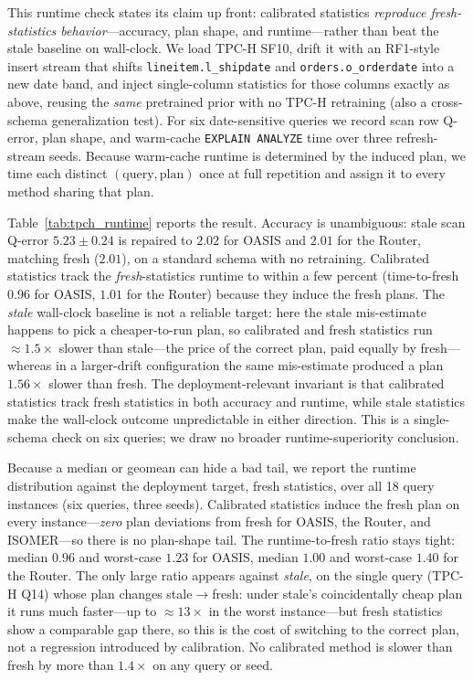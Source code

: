 \documentclass[preprint,12pt]{elsarticle}
\newcommand{\oasisUseMaxWidthResize}[1]{%
  \renewcommand{\resizebox}[3]{\adjustbox{max width=#1}{##3}}%
}
\begin{document}
This runtime check states its claim up front: calibrated statistics \emph{reproduce
fresh-statistics behavior}---accuracy, plan shape, and runtime---rather than beat the stale
baseline on wall-clock. We load TPC-H
SF10, drift it with an RF1-style insert stream that shifts \texttt{lineitem.l\_shipdate}
and \texttt{orders.o\_orderdate} into a new date band, and inject single-column
statistics for those columns exactly as above, reusing the \emph{same} pretrained prior
with no TPC-H retraining (also a cross-schema generalization test). For six
date-sensitive queries we record scan row Q-error, plan shape, and warm-cache
\texttt{EXPLAIN ANALYZE} time over three refresh-stream seeds. Because warm-cache
runtime is determined by the induced plan, we time each distinct $(\text{query},
\text{plan})$ once at full repetition and assign it to every method sharing that plan.

\begingroup
\oasisUseMaxWidthResize{.92\columnwidth}

\endgroup

Table~\ref{tab:tpch_runtime} reports the result. Accuracy is unambiguous: stale scan
Q-error $5.23\pm0.24$ is repaired to $2.02$ for OASIS and $2.01$ for the Router,
matching fresh ($2.01$), on a standard schema with no retraining. Calibrated statistics
track the \emph{fresh}-statistics runtime to within a few percent (time-to-fresh
$0.96$ for OASIS, $1.01$ for the Router) because they induce the fresh plans. The
\emph{stale} wall-clock baseline is not a reliable target: here the stale mis-estimate
happens to pick a cheaper-to-run plan, so calibrated and fresh statistics run
$\approx 1.5\times$ slower than stale---the price of the correct plan, paid equally by
fresh---whereas in a larger-drift configuration the same mis-estimate produced a plan
$1.56\times$ slower than fresh. The deployment-relevant invariant is that calibrated
statistics track fresh statistics in both accuracy and runtime, while stale statistics
make the wall-clock outcome unpredictable in either direction. This is a single-schema
check on six queries; we draw no broader runtime-superiority conclusion.

Because a median or geomean can hide a bad tail, we report the runtime distribution against
the deployment target, fresh statistics, over all 18 query instances (six queries, three
seeds). Calibrated statistics induce the fresh plan on every instance---\emph{zero} plan
deviations from fresh for OASIS, the Router, and ISOMER---so there is no plan-shape tail.
The runtime-to-fresh ratio stays tight: median $0.96$ and worst-case $1.23$ for OASIS,
median $1.00$ and worst-case $1.40$ for the Router. The only large ratio appears against
\emph{stale}, on the single query (TPC-H Q14) whose plan changes stale$\to$fresh: under
stale's coincidentally cheap plan it runs much faster---up to $\approx 13\times$ in the
worst instance---but fresh statistics show a comparable gap there, so this is the cost of
switching to the correct plan, not a regression introduced by calibration. No calibrated method is slower than fresh by more than
$1.4\times$ on any query or seed.
\end{document}
